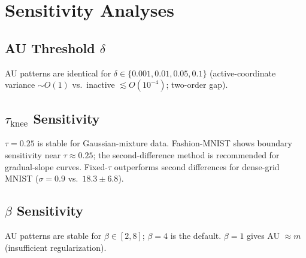 \documentclass[make,article,submit,pdftex,moreauthors]{Definitions/mdpi}
\begin{document}
\section[\appendixname~\thesection]{Sensitivity Analyses}\label{app:sensitivity}

\subsection{AU Threshold $\delta$}\label{app:delta}
AU patterns are identical for $\delta \in \{0.001, 0.01, 0.05, 0.1\}$
(active-coordinate variance $\sim O(1)$ vs.\ inactive
$\lesssim O(10^{-4})$; two-order gap).

\subsection{\texorpdfstring{$\tau_{\mathrm{knee}}$ Sensitivity}
{tau-knee Sensitivity}}\label{app:tau_knee}
$\tau = 0.25$ is stable for Gaussian-mixture data.
Fashion-MNIST shows boundary sensitivity near $\tau \approx 0.25$;
the second-difference method is recommended for gradual-slope curves.
Fixed-$\tau$ outperforms second differences for dense-grid MNIST
($\sigma = 0.9$ vs.\ $18.3 \pm 6.8$).

\subsection{\texorpdfstring{$\beta$ Sensitivity}{beta Sensitivity}}
\label{app:beta}
AU patterns are stable for $\beta \in [2, 8]$; $\beta = 4$ is the default.
$\beta = 1$ gives AU $\approx m$ (insufficient regularization).
\end{document}
